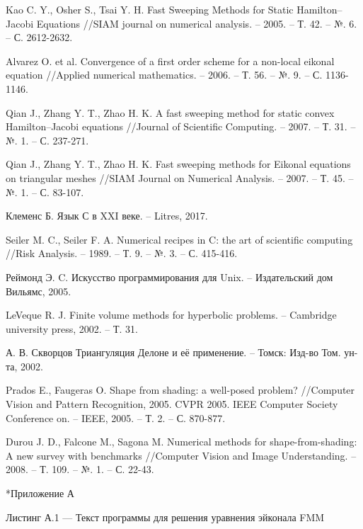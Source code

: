 \documentclass[a4paper,12pt]{article}
\makeatletter
\renewcommand{\section}{\@startsection{section}{1}{0cm}{-3.5ex plus -1ex minus -.2ex}{2.3ex plus.2ex}{\raggedright\normalfont}}
\makeatother
\begin{document}
\begin{thebibliography}{99}
 Kao C. Y., Osher S., Tsai Y. H. Fast Sweeping
  Methods for Static Hamilton--Jacobi Equations //SIAM journal on
  numerical analysis. – 2005. – Т. 42. – №. 6. – С. 2612-2632.

Alvarez O. et al. Convergence of a first order scheme
  for a non-local eikonal equation //Applied numerical mathematics. –
  2006. – Т. 56. – №. 9. – С. 1136-1146.
  
Qian J., Zhang Y. T., Zhao H. K. A fast sweeping
  method for static convex Hamilton–Jacobi equations //Journal of
  Scientific Computing. – 2007. – Т. 31. – №. 1. – С. 237-271.
  
 Qian J., Zhang Y. T., Zhao H. K. Fast sweeping
  methods for Eikonal equations on triangular meshes //SIAM Journal on
  Numerical Analysis. – 2007. – Т. 45. – №. 1. – С. 83-107.

 Клеменс Б. Язык С в XXI веке. – Litres, 2017.

Seiler M. C., Seiler F. A. Numerical recipes in C: the
  art of scientific computing //Risk Analysis. – 1989. – Т. 9. –
  №. 3. – С. 415-416.
  
 Реймонд Э. C. Искусство программирования для Unix. –
  Издательский дом Вильямс, 2005.

 LeVeque R. J. Finite volume methods for hyperbolic
  problems. – Cambridge university press, 2002. – Т. 31.

 {А. В. Скворцов} Триангуляция Делоне и её применение. –
  Томск: Изд-во Том. ун-та, 2002.

 Prados E., Faugeras O. Shape from shading: a
  well-posed problem? //Computer Vision and Pattern Recognition,
  2005. CVPR 2005. IEEE Computer Society Conference on. – IEEE,
  2005. – Т. 2. – С. 870-877.
  
Durou J. D., Falcone M., Sagona M. Numerical methods
  for shape-from-shading: A new survey with benchmarks //Computer
  Vision and Image Understanding. – 2008. – Т. 109. – №. 1. –
  С. 22-43.
\end{thebibliography}

\pagebreak
\section*{Приложение А}
\label{sec:appl}

\vspace{1em}
Листинг А.1 --- Текст программы для решения уравнения эйконала FMM
\end{document}
